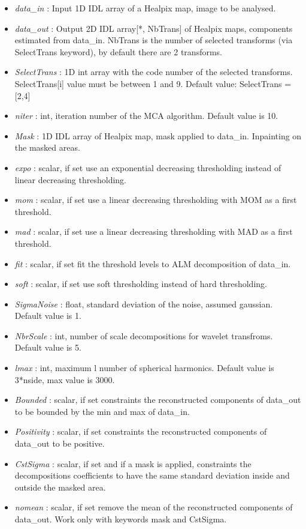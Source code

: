 \begin{itemize}
\item {\em data\_in} : Input 1D IDL array of a Healpix map, image to be analysed.
\item {\em data\_out} : Output 2D IDL array[*, NbTrans] of Healpix maps, components estimated from data\_in. NbTrans is the number 
of selected transforms (via SelectTrans keyword), by default there are 2 transforms.
\item {\em SelectTrans} : 1D int array with the code number of the selected transforms. SelectTrans[i] value must be between 1 and 9. Default value: SelectTrans = [2,4]
\item {\em niter} : int, iteration number of the MCA algorithm. Default value is 10.
\item {\em Mask} : 1D IDL array of Healpix map, mask applied to data\_in. Inpainting on the masked areas.
\item {\em expo} : scalar, if set use an exponential decreasing thresholding instead of linear decreasing thresholding.
\item {\em mom} : scalar, if set use a linear decreasing thresholding with MOM as a first threshold.
\item {\em mad} : scalar, if set use a linear decreasing thresholding with MAD as a first threshold.
\item {\em fit} : scalar, if set fit the threshold levels to ALM decomposition of data\_in.
\item {\em soft} : scalar, if set use soft thresholding instead of hard thresholding.
\item {\em SigmaNoise} : float, standard deviation of the noise, assumed gaussian. Default value is 1.
\item {\em NbrScale} : int, number of scale decompositions for wavelet transfroms. Default value is 5.
\item {\em lmax} : int, maximum l number of spherical harmonics. Default value is 3*nside, max value is 3000.
\item {\em Bounded} : scalar, if set constraints the reconstructed components of data\_out to be bounded by the min and max of data\_in.
\item {\em Positivity} : scalar, if set constraints the reconstructed components of data\_out to be positive.
\item {\em CstSigma} : scalar, if set and if a mask is applied, constraints the decompositions coefficients to have the same standard deviation inside and outside the masked area.
\item {\em nomean} : scalar, if set remove the mean of the reconstructed components of data\_out. Work only with keywords mask and CstSigma.

\end{itemize}

